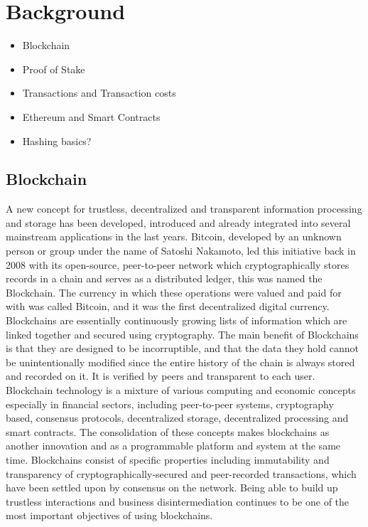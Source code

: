 \section{Background}

\begin{itemize}
\item Blockchain
\item Proof of Stake
\item Transactions and Transaction costs
\item Ethereum and Smart Contracts
\item Hashing basics?
\end{itemize}

\subsection{Blockchain}

A new concept for trustless, decentralized and transparent information processing and storage has been developed, introduced and already integrated into several mainstream applications in the last years. Bitcoin, developed by an unknown person or group under the name of Satoshi Nakamoto, led this initiative back in 2008 with its open-source, peer-to-peer network which cryptographically stores records in a chain and serves as a distributed ledger, this was named the Blockchain. The currency in which these operations were valued and paid for with was called Bitcoin, and it was the first decentralized digital currency. 
Blockchains are essentially continuously growing lists of information which are linked together and secured using cryptography. The main benefit of Blockchains is that they are designed to be incorruptible, and that the data they hold cannot be unintentionally modified since the entire history of the chain is always stored and recorded on it. It is verified by peers and transparent to each user. 
Blockchain technology is a mixture of various computing and economic concepts especially in financial sectors, including peer-to-peer systems, cryptography based, consensus protocols, decentralized storage, decentralized processing and smart contracts. The consolidation of these concepts makes blockchains as another innovation and as a programmable platform and system at the same time. Blockchains consist of specific properties including immutability and transparency of cryptographically-secured and peer-recorded transactions, which have been settled upon by consensus on the network. Being able to build up trustless interactions and business disintermediation continues to be one of the most important objectives of using blockchains.

